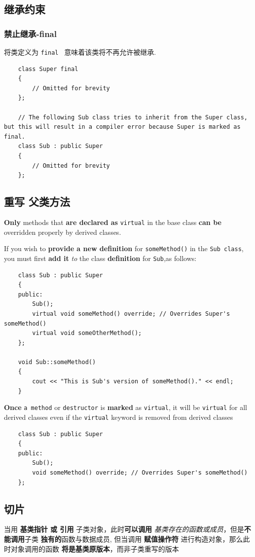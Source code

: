 \documentclass[UTF8,a4paper,12pt]{ctexbook} %
\begin{document}
	\subsection{继承约束}
		\subsubsection{禁止继承-final}
			将类定义为 \verb|final | 意味着该类将不再允许被继承.
			\begin{lstlisting}
	class Super final
	{
		// Omitted for brevity
	};
	
	// The following Sub class tries to inherit from the Super class, but this will result in a compiler error because Super is marked as final.
	class Sub : public Super
	{
		// Omitted for brevity
	};
			\end{lstlisting}
			
	\subsection{重写 父类方法}
			\textbf{Only} methods that \textbf{are declared as} \verb|virtual| in the base class \textbf{can be} overridden properly by derived classes.
			
			If you wish to \textbf{provide a new definition} for \verb|someMethod()| in the \verb|Sub class|, you must first \textbf{add it} \textit{to} the class \textbf{definition} for \verb|Sub|,as follows:
		
			\begin{lstlisting}
	class Sub : public Super
	{
	public:
		Sub();
		virtual void someMethod() override; // Overrides Super's someMethod()
		virtual void someOtherMethod();
	};
	
	void Sub::someMethod()
	{
		cout << "This is Sub's version of someMethod()." << endl;
	}
			\end{lstlisting}
		
		\textbf{Once} \verb|a method| or \verb|destructor| is \textbf{marked} as \verb|virtual|, it will be \verb|virtual| for all derived classes even if the \verb|virtual| keyword is removed from derived classes
		
			\begin{lstlisting}
	class Sub : public Super
	{
	public:
		Sub();
		void someMethod() override; // Overrides Super's someMethod()
	};
			\end{lstlisting}
			
	\subsection{切片} 
			当用 \textbf{基类指针 或 引用} 子类对象，此时\textbf{可以调用} \textit{基类存在的函数或成员}，但是\textbf{不能调用}子类 \textbf{独有的}函数与数据成员, 但当调用 \textbf{赋值操作符} 进行构造对象，那么此时对象调用的函数 \textbf{将是基类原版本}，而非子类重写的版本
			
\end{document}
